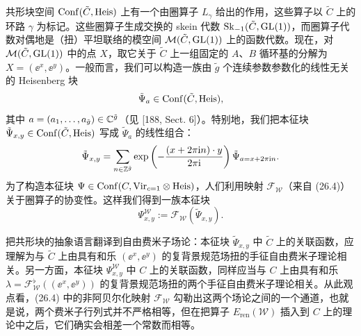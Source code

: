 共形块空间 $\operatorname{Conf}(\tilde C,\mathrm{Heis})$ 上有一个由圈算子 $L_\gamma$ 给出的作用，这些算子以 $\tilde C$ 上的环路 $\gamma$ 为标记。这些圈算子生成交换的 skein 代数 $\mathrm{Sk}_{-1}(\tilde C,\operatorname{GL}(1))$，而圈算子代数对偶地是（扭）平坦联络的模空间 $\mathcal{M}(\tilde C,\operatorname{GL}(1))$ 上的函数代数。现在，对 $\mathcal{M}(\tilde C,\operatorname{GL}(1))$ 中的点 $X$，取它关于 $\tilde C$ 上一组固定的 $A$、$B$ 循环基的分解为 $X=(\ee^{x},\ee^{y})$。一般而言，我们可以构造一族由 $\tilde g$ 个连续参数参数化的线性无关的 Heisenberg 块
\[
\tilde\Psi_a\in\operatorname{Conf}(\tilde C,\mathrm{Heis}),
\]
其中 $a=(a_1,\dots,a_{\tilde g})\in\mathbb{C}^{\tilde g}$（见 [188, Sect. 6]）。特别地，我们把本征块 $\tilde\Psi_{x,y}\in\operatorname{Conf}(\tilde C,\mathrm{Heis})$ 写成 $\tilde\Psi_a$ 的线性组合：
\[
\tilde\Psi_{x,y}=\sum_{n\in\mathbb{Z}^{\tilde g}}\exp\left(-\frac{(x+2\pi\mathrm{i} n)\cdot y}{2\pi\mathrm{i}}\right)\tilde\Psi_{a=x+2\pi\mathrm{i} n}.
\]
为了构造本征块 $\Psi\in\operatorname{Conf}(C,\mathrm{Vir}_{c=1}\otimes\mathrm{Heis})$，人们利用映射 $\mathcal{F}_{\mathcal{W}}$（来自 (26.4)）关于圈算子的协变性。这样我们得到一族本征块
\[
\Psi^{\mathcal{W}}_{x,y}:=\mathcal{F}_{\mathcal{W}}(\tilde\Psi_{x,y}).
\]

把共形块的抽象语言翻译到自由费米子场论：本征块 $\tilde\Psi_{x,y}$ 中 $\tilde C$ 上的关联函数，应理解为与 $\tilde C$ 上由具有和乐 $(\ee^{x},\ee^{y})$ 的复背景规范场扭的手征自由费米子理论相关。另一方面，本征块 $\Psi^{\mathcal{W}}_{x,y}$ 中 $C$ 上的关联函数，同样应当与 $C$ 上由具有和乐 $\lambda=\mathcal{F}^{\flat}_{\mathcal{W}}((\ee^{x},\ee^{y}))$ 的复背景规范场扭的两个手征自由费米子理论相关。从此观点看，(26.4) 中的非阿贝尔化映射 $\mathcal{F}_{\mathcal{W}}$ 勾勒出这两个场论之间的一个通道，也就是说，两个费米子行列式并不严格相等，但在把算子 $E_{\mathrm{ren}}(\mathcal{W})$ 插入到 $C$ 上的理论中之后，它们确实会相差一个常数而相等。


